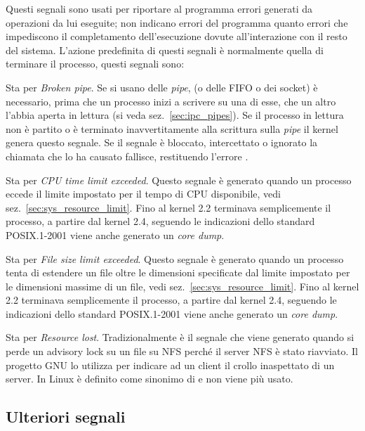 Questi segnali sono usati per riportare al programma errori generati da
operazioni da lui eseguite; non indicano errori del programma quanto errori
che impediscono il completamento dell'esecuzione dovute all'interazione con il
resto del sistema.  L'azione predefinita di questi segnali è normalmente
quella di terminare il processo, questi segnali sono:
\begin{basedescript}{\desclabelwidth{2.0cm}}
\item[\signald{SIGPIPE}] Sta per \textit{Broken pipe}. Se si usano delle
  \textit{pipe}, (o delle FIFO o dei socket) è necessario, prima che un
  processo inizi a scrivere su una di esse, che un altro l'abbia aperta in
  lettura (si veda sez.~\ref{sec:ipc_pipes}). Se il processo in lettura non è
  partito o è terminato inavvertitamente alla scrittura sulla \textit{pipe} il
  kernel genera questo segnale. Se il segnale è bloccato, intercettato o
  ignorato la chiamata che lo ha causato fallisce, restituendo l'errore
  .

\item[\signald{SIGXCPU}] Sta per \textit{CPU time limit exceeded}. Questo
  segnale è generato quando un processo eccede il limite impostato per il
  tempo di CPU disponibile, vedi sez.~\ref{sec:sys_resource_limit}. Fino al
  kernel 2.2 terminava semplicemente il processo, a partire dal kernel 2.4,
  seguendo le indicazioni dello standard POSIX.1-2001 viene anche generato un
  \textit{core dump}.

\item[\signald{SIGXFSZ}] Sta per \textit{File size limit exceeded}. Questo
  segnale è generato quando un processo tenta di estendere un file oltre le
  dimensioni specificate dal limite impostato per le dimensioni massime di un
  file, vedi sez.~\ref{sec:sys_resource_limit}.  Fino al kernel 2.2 terminava
  semplicemente il processo, a partire dal kernel 2.4, seguendo le indicazioni
  dello standard POSIX.1-2001 viene anche generato un \textit{core dump}.

\item[\signald{SIGLOST}] Sta per \textit{Resource lost}. Tradizionalmente è il
  segnale che viene generato quando si perde un advisory lock su un file su
  NFS perché il server NFS è stato riavviato. Il progetto GNU lo utilizza per
  indicare ad un client il crollo inaspettato di un server. In Linux è
  definito come sinonimo di  e non viene più usato.
\end{basedescript}


\subsection{Ulteriori segnali}
\label{sec:sig_misc_sig}

